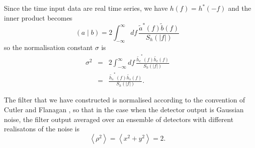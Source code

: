 Since the time input data are real time series, we have $h(f) = h^\ast(-f)$
and the inner product becomes
\begin{equation}
\left(a\mid b\right) = 2 \int_{-\infty}^{\infty}df\,
\frac{\tilde{a}^\ast(f)\tilde{b}(f)}{S_h\left(\left|f\right|\right)}
\end{equation}
so the normalisation constant $\sigma$ is
\begin{eqnarray}
\sigma^2 &=& 2 \int_{-\infty}^{\infty}df\,
\frac{\tilde{h_c}^\ast(f)\tilde{h_c}(f)}{S_h\left(\left|f\right|\right)} \\
&=& \frac{\tilde{h_s}^\ast(f)\tilde{h_s}(f)}{S_h\left(\left|f\right|\right)}.
\end{eqnarray}

The filter that we have constructed is normalised according to the convention
of Cutler and Flanagan \cite{cutflan}, so that in the case when the detector
output is Gaussian noise, the filter output averaged over an ensemble of
detectors with different realisatons of the noise is
\begin{equation}
\left\langle \rho^2 \right\rangle = \left\langle x^2 + y^2 \right\rangle = 2.
\end{equation}

